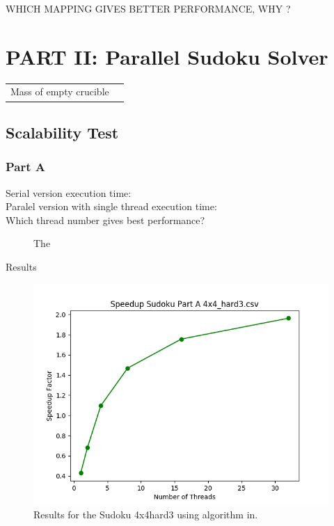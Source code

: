 \documentclass{article}
\begin{document}
WHICH MAPPING GIVES BETTER PERFORMANCE, WHY ? 

\newpage

\section{PART II: Parallel Sudoku Solver}

\begin{tabular}{ll}
Mass of empty crucible \\

\end{tabular}

\subsection{Scalability Test}
\subsubsection{Part A}
\begin{description}
\item[Serial version execution time: ] 
\item[Paralel version with single thread execution time: ]
\item[Which thread number gives best performance?]
The
\end{description} 

Results 
 \begin{figure}[!htb]
    \centering
        \includegraphics[width=1\linewidth]{./img/speedup_part_2_A.png}
        \caption{\small Results for the Sudoku 4x4hard3 using algorithm in.}
\end{figure}                
\end{document}

